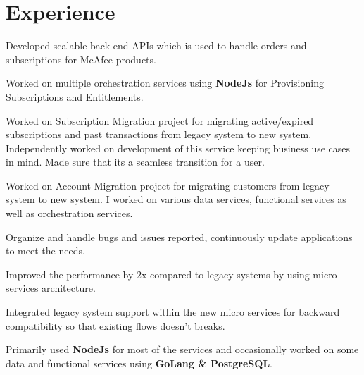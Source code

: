 \documentclass[letterpaper]{deedy-resume} %
\begin{document}
\begin{minipage}[t]{0.66\textwidth} %


\section{Experience}
\sectionspace
{}

\vspace{\topsep} %
\begin{tightitemize}
\item Developed scalable back-end APIs which is used to handle orders and subscriptions for McAfee products.  
\item Worked on multiple orchestration services using \textbf{NodeJs} for Provisioning Subscriptions and Entitlements.
\item Worked on Subscription Migration project for migrating active/expired subscriptions and past transactions from legacy system to new system. Independently worked on development of this service keeping business use cases in mind. Made sure that its a seamless transition for a user.
\item Worked on Account Migration project for migrating customers from legacy system to new system. I worked on various data services, functional services as well as orchestration services.
\item Organize and handle bugs and issues reported, continuously update applications to meet the needs.
\item Improved the performance by 2x compared to legacy systems by using micro services architecture.
\item Integrated legacy system support within the new micro services for backward compatibility so that existing flows doesn't breaks.
\item Primarily used \textbf{NodeJs} for most of the services and occasionally worked on some data and functional services using \textbf{GoLang \& PostgreSQL}.
\end{tightitemize}

\sectionspace %
\sectionspace


\end{minipage}
\end{document}
